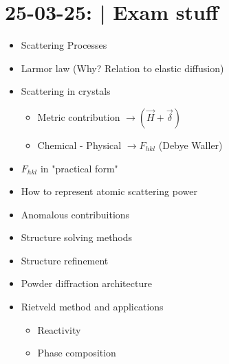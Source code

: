 \section{25-03-25: | Exam stuff}
\begin{itemize}
    \item Scattering Processes
    \item Larmor law (Why? Relation to elastic diffusion)
    \item Scattering in crystals
    \begin{itemize}
        \item Metric contribution $\rightarrow (\vec{H} + \vec{\delta})$
        \item Chemical - Physical $\rightarrow F_{hkl}$ (Debye Waller)
    \end{itemize}
    \item $F_{hkl}$ in "practical form"
    \item How to represent atomic scattering power
    \item Anomalous contribuitions
    \item Structure solving methods
    \item Structure refinement
    \item Powder diffraction architecture
    \item Rietveld method and applications
    \begin{itemize}
        \item Reactivity
        \item Phase composition
    \end{itemize}
\end{itemize}